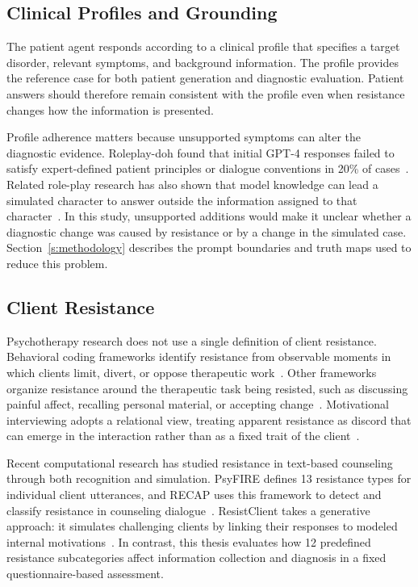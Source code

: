 \subsection{Clinical Profiles and Grounding}

The patient agent responds according to a clinical profile that specifies a target disorder, relevant symptoms, and background information. The profile provides the reference case for both patient generation and diagnostic evaluation. Patient answers should therefore remain consistent with the profile even when resistance changes how the information is presented.

Profile adherence matters because unsupported symptoms can alter the diagnostic evidence. Roleplay-doh found that initial GPT-4 responses failed to satisfy expert-defined patient principles or dialogue conventions in 20\% of cases~\cite{louie2024roleplaydoh}. Related role-play research has also shown that model knowledge can lead a simulated character to answer outside the information assigned to that character~\cite{sadeq2024rolefact}. In this study, unsupported additions would make it unclear whether a diagnostic change was caused by resistance or by a change in the simulated case. Section~\ref{s:methodology} describes the prompt boundaries and truth maps used to reduce this problem.

\subsection{Client Resistance}

Psychotherapy research does not use a single definition of client resistance. Behavioral coding frameworks identify resistance from observable moments in which clients limit, divert, or oppose therapeutic work~\cite{chamberlain1984observation,otani1989client}. Other frameworks organize resistance around the therapeutic task being resisted, such as discussing painful affect, recalling personal material, or accepting change~\cite{mahalik1994development}. Motivational interviewing adopts a relational view, treating apparent resistance as discord that can emerge in the interaction rather than as a fixed trait of the client~\cite{miller2013motivational}.

Recent computational research has studied resistance in text-based counseling through both recognition and simulation. PsyFIRE defines 13 resistance types for individual client utterances, and RECAP uses this framework to detect and classify resistance in counseling dialogue~\cite{li2026recap}. ResistClient takes a generative approach: it simulates challenging clients by linking their responses to modeled internal motivations~\cite{liu2026resistclient}. In contrast, this thesis evaluates how 12 predefined resistance subcategories affect information collection and diagnosis in a fixed questionnaire-based assessment.

